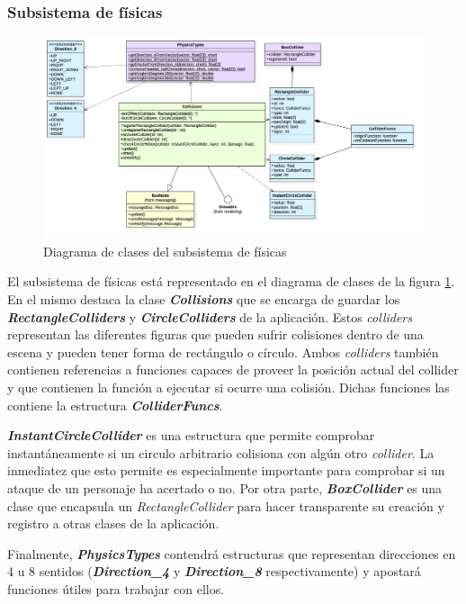 \subsubsection*{Subsistema de físicas}

\begin{figure}
	\centerline{\includegraphics[width=18cm]{otros/UML/png/alld/png/physics__diagramaDeClases_physics_2.png}}
	\caption{Diagrama de clases del subsistema de físicas}
	\label{class:collisions}
\end{figure}

El subsistema de físicas está representado en el diagrama de clases de la figura \ref{class:collisions}. En el mismo destaca la clase \textit{\textbf{Collisions}} que se encarga de guardar los \textit{\textbf{RectangleColliders}} y \textbf{\textit{CircleColliders}} de la aplicación. Estos \textit{colliders} representan las diferentes figuras que pueden sufrir colisiones dentro de una escena y pueden tener forma de rectángulo o círculo. Ambos \textit{colliders} también contienen referencias a funciones capaces de proveer la posición actual del collider y que contienen la función a ejecutar si ocurre una colisión. Dichas funciones las contiene la estructura \textbf{\textit{ColliderFuncs}}.

\bigskip
\textbf{\textit{InstantCircleCollider}} es una estructura que permite comprobar instantáneamente si un circulo arbitrario colisiona con algún otro \textit{collider}. La inmediatez que esto permite es especialmente importante para comprobar si un ataque de un personaje ha acertado o no. Por otra parte, \textbf{\textit{BoxCollider}} es una clase que encapsula un \textit{RectangleCollider} para hacer transparente su creación y registro a otras clases de la aplicación.

\bigskip
Finalmente, \textbf{\textit{PhysicsTypes}} contendrá estructuras que representan direcciones en 4 u 8 sentidos (\textbf{\textit{Direction\_4}} y \textbf{\textit{Direction\_8}} respectivamente) y apostará funciones útiles para trabajar con ellos.


